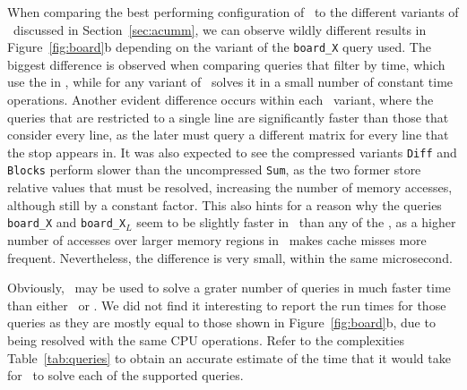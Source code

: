     When comparing the best performing configuration of \ttctr~to the different variants of \acumm~discussed in Section~\ref{sec:acumm}, we can observe wildly different results in Figure~\ref{fig:board}b depending on the variant of the \texttt{board\_X} query used. The biggest difference is observed when comparing queries that filter by time, which use the  in \ttctr, while for any variant of \acumm~solves it in a small number of constant time operations. Another evident difference occurs within each \acumm~variant, where the queries that are restricted to a single line are significantly faster than those that consider every line, as the later must query a different matrix for every line that the stop appears in. It was also expected to see the compressed variants \texttt{Diff} and \texttt{Blocks} perform slower than the uncompressed \texttt{Sum}, as the two former store relative values that must be resolved, increasing the number of memory accesses, although still by a constant factor. This also hints for a reason why the queries \texttt{board\_X} and \texttt{board\_X$_{L}$} seem to be slightly faster in \ttctr~than any of the \acumm, as a higher number of accesses over larger memory regions in \acumm~makes cache misses more frequent. Nevertheless, the difference is very small, within the same microsecond.
    
    Obviously, \acumm~may be used to solve a grater number of queries in much faster time than either \ttctr~or \ctr. We did not find it interesting to report the run times for those queries as they are mostly equal to those shown in Figure~\ref{fig:board}b, due to being resolved with the same CPU operations. Refer to the complexities Table~\ref{tab:queries} to obtain an accurate estimate of the time that it would take for \acumm~to solve each of the supported queries.
